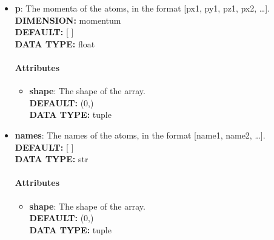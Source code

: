 \begin{itemize}
\item {\bf p}:
 The momenta of the atoms, in the format [px1, py1, pz1, px2, \ldots  ].
{\\ \bf DIMENSION: }momentum
{\\ \bf DEFAULT: }[ ]
{\\ \bf DATA TYPE: }float
\paragraph{Attributes}
 \begin{itemize}
\item {\bf shape}:
 The shape of the array.
{\\ \bf DEFAULT: }(0,)
{\\ \bf DATA TYPE: }tuple
\end{itemize}
 
\item {\bf names}:
 The names of the atoms, in the format [name1, name2, \ldots  ].
{\\ \bf DEFAULT: }[ ]
{\\ \bf DATA TYPE: }str
\paragraph{Attributes}
 \begin{itemize}
\item {\bf shape}:
 The shape of the array.
{\\ \bf DEFAULT: }(0,)
{\\ \bf DATA TYPE: }tuple
\end{itemize}
 
\end{itemize}
 
